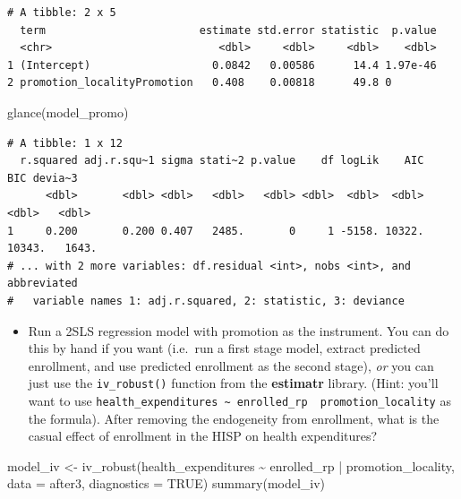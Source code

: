 \documentclass[
  letterpaper,
  DIV=11,
  numbers=noendperiod]{scrartcl}
\newenvironment{Shaded}{\begin{snugshade}}{\end{snugshade}}
\newcommand{\AttributeTok}[1]{\textcolor[rgb]{0.40,0.45,0.13}{#1}}
\newcommand{\ConstantTok}[1]{\textcolor[rgb]{0.56,0.35,0.01}{#1}}
\newcommand{\FunctionTok}[1]{\textcolor[rgb]{0.28,0.35,0.67}{#1}}
\newcommand{\NormalTok}[1]{\textcolor[rgb]{0.00,0.23,0.31}{#1}}
\newcommand{\OtherTok}[1]{\textcolor[rgb]{0.00,0.23,0.31}{#1}}
\newcommand{\SpecialCharTok}[1]{\textcolor[rgb]{0.37,0.37,0.37}{#1}}
\providecommand{\tightlist}{%
  \setlength{\itemsep}{0pt}\setlength{\parskip}{0pt}}\usepackage{longtable,booktabs,array}
\begin{document}
\begin{verbatim}
# A tibble: 2 x 5
  term                        estimate std.error statistic  p.value
  <chr>                          <dbl>     <dbl>     <dbl>    <dbl>
1 (Intercept)                   0.0842   0.00586      14.4 1.97e-46
2 promotion_localityPromotion   0.408    0.00818      49.8 0       
\end{verbatim}

\begin{Shaded}
\begin{Highlighting}[numbers=left,,]
\FunctionTok{glance}\NormalTok{(model\_promo)}
\end{Highlighting}
\end{Shaded}

\begin{verbatim}
# A tibble: 1 x 12
  r.squared adj.r.squ~1 sigma stati~2 p.value    df logLik    AIC    BIC devia~3
      <dbl>       <dbl> <dbl>   <dbl>   <dbl> <dbl>  <dbl>  <dbl>  <dbl>   <dbl>
1     0.200       0.200 0.407   2485.       0     1 -5158. 10322. 10343.   1643.
# ... with 2 more variables: df.residual <int>, nobs <int>, and abbreviated
#   variable names 1: adj.r.squared, 2: statistic, 3: deviance
\end{verbatim}

\begin{itemize}
\tightlist
\item
  Run a 2SLS regression model with promotion as the instrument. You can
  do this by hand if you want (i.e.~run a first stage model, extract
  predicted enrollment, and use predicted enrollment as the second
  stage), \emph{or} you can just use the \texttt{iv\_robust()} function
  from the \textbf{estimatr} library. (Hint: you'll want to use
  \texttt{health\_expenditures\ \textasciitilde{}\ enrolled\_rp\ \textbar{}\ promotion\_locality}
  as the formula). After removing the endogeneity from enrollment, what
  is the casual effect of enrollment in the HISP on health expenditures?
\end{itemize}

\begin{Shaded}
\begin{Highlighting}[numbers=left,,]
\NormalTok{model\_iv }\OtherTok{\textless{}{-}} \FunctionTok{iv\_robust}\NormalTok{(health\_expenditures }\SpecialCharTok{\textasciitilde{}}\NormalTok{ enrolled\_rp }\SpecialCharTok{|}\NormalTok{ promotion\_locality,}
          \AttributeTok{data =}\NormalTok{ after3, }\AttributeTok{diagnostics =} \ConstantTok{TRUE}\NormalTok{)}
\FunctionTok{summary}\NormalTok{(model\_iv)}
\end{Highlighting}
\end{Shaded}
\end{document}
